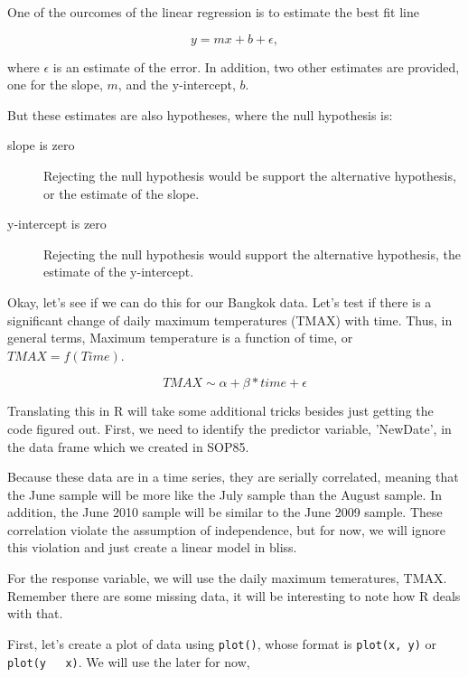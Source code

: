 \documentclass{article}\usepackage[]{graphicx}\usepackage[]{color}
\begin{document}
One of the ourcomes of the linear regression is to estimate the best fit line

\begin{equation}
y = mx + b + \epsilon,
\end{equation}

where $\epsilon$ is an estimate of the error. In addition, two other estimates are provided, one for the slope, $m$, and the y-intercept, $b$. 

But these estimates are also hypotheses, where the null hypothesis is:

\begin{description}
  \item[slope is zero] Rejecting the null hypothesis would be support the alternative hypothesis, or the estimate of the slope. 
  \item[y-intercept is zero] Rejecting the null hypothesis would support the alternative hypothesis, the estimate of the y-intercept.
\end{description}

Okay, let's see if we can do this for our Bangkok data. Let's test if there is a significant change of daily maximum temperatures (TMAX) with time. Thus, in general terms, Maximum temperature is a function of time, or $TMAX = f(Time)$. 

\begin{equation}
TMAX \sim \alpha + \beta * time + \epsilon
\end{equation}

Translating this in R will take some additional tricks besides just getting the code figured out. First, we need to identify the predictor variable, 'NewDate', in the data frame which we created in SOP85. 

Because these data are in a time series, they are serially correlated, meaning that the June sample will be more like the July sample than the August sample. In addition, the June 2010 sample will be similar to the June 2009 sample. These correlation violate the assumption of independence, but for now, we will ignore this violation and just create a linear model in bliss. 

For the response variable, we will use the daily maximum temeratures, TMAX. Remember there are some missing data, it will be interesting to note how R deals with that.

First, let's create a plot of data using \texttt{plot()}, whose format is \texttt{plot(x, y)} or \texttt{plot(y ~ x)}. We will use the later for now, 
\end{document}
